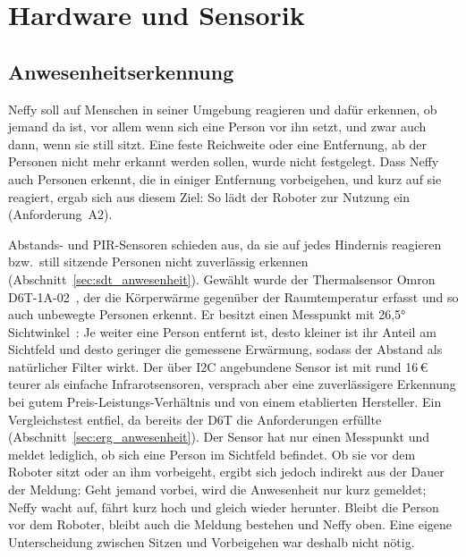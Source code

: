 \section{Hardware und Sensorik}
\label{sec:hardware}

\subsection{Anwesenheitserkennung}
\label{sec:hw_anwesenheit}

Neffy soll auf Menschen in seiner Umgebung reagieren und dafür erkennen, ob jemand da ist,
vor allem wenn sich eine Person vor ihn setzt, und zwar auch dann, wenn sie still sitzt. Eine
feste Reichweite oder eine Entfernung, ab der Personen nicht mehr erkannt werden sollen, wurde
nicht festgelegt. Dass Neffy auch Personen erkennt, die in einiger Entfernung vorbeigehen, und
kurz auf sie reagiert, ergab sich aus diesem Ziel: So lädt der Roboter zur Nutzung ein
(Anforderung~A2).

Abstands- und \ac{PIR}-Sensoren schieden aus, da sie auf jedes Hindernis reagieren bzw.\
still sitzende Personen nicht zuverlässig erkennen (Abschnitt~\ref{sec:sdt_anwesenheit}).
Gewählt wurde der Thermalsensor Omron D6T-1A-02~\cite{omron2017d6t}, der die Körperwärme
gegenüber der Raumtemperatur erfasst und so auch unbewegte Personen erkennt. Er besitzt einen
Messpunkt mit 26{,}5° Sichtwinkel~\cite{omron2017d6t}: Je weiter eine Person entfernt ist,
desto kleiner ist ihr Anteil am Sichtfeld und desto geringer die gemessene Erwärmung, sodass
der Abstand als natürlicher Filter wirkt. Der über \ac{I2C} angebundene Sensor ist mit rund
16\,€ teurer als einfache Infrarotsensoren, versprach aber eine zuverlässigere Erkennung bei
gutem Preis-Leistungs-Verhältnis und von einem etablierten Hersteller. Ein Vergleichstest
entfiel, da bereits der D6T die Anforderungen erfüllte (Abschnitt~\ref{sec:erg_anwesenheit}).
Der Sensor hat nur einen Messpunkt und
meldet lediglich, ob sich eine Person im Sichtfeld befindet. Ob sie vor dem Roboter sitzt oder
an ihm vorbeigeht, ergibt sich jedoch indirekt aus der Dauer der Meldung: Geht jemand vorbei,
wird die Anwesenheit nur kurz gemeldet; Neffy wacht auf, fährt kurz hoch und gleich wieder
herunter. Bleibt die Person vor dem Roboter, bleibt auch die Meldung bestehen und Neffy oben.
Eine eigene Unterscheidung zwischen Sitzen und Vorbeigehen war deshalb nicht nötig.

